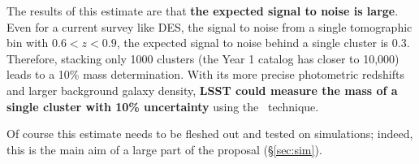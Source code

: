 The results of this estimate are that {\bf the expected signal to noise is large}. Even for a current survey like DES, the signal to noise from a single tomographic bin with $0.6<z<0.9$, the expected signal to noise behind a single cluster is 0.3. Therefore, stacking only 1000 clusters (the Year 1 catalog has closer to 10,000) leads to a 10\% mass determination. With its more precise photometric redshifts and larger background galaxy density, {\bf LSST could measure the mass of a single cluster with 10\% uncertainty} using the \atf\ technique.

%
Of course this estimate needs to be fleshed out and tested on simulations; 
indeed, this is the main aim of a large part of the proposal (\S\ref{sec:sim}).






